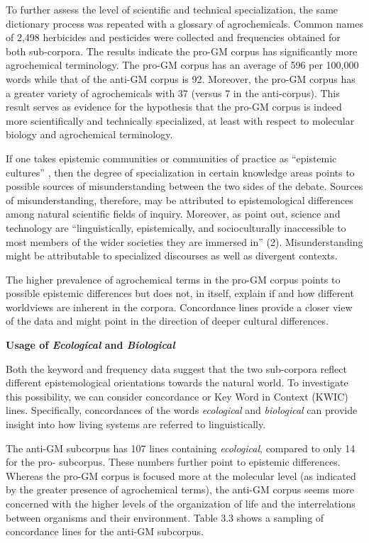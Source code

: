 To further assess the level of scientific and technical specialization, the same dictionary process was repeated with a glossary of agrochemicals. Common names of 2,498 herbicides \citep{UniversityofKentuckya} and pesticides \citep{Wood2018a} were collected and frequencies obtained for both sub-corpora. The results indicate the pro-GM corpus has significantly more agrochemical terminology. The pro-GM corpus has an average of 596 per 100,000 words while that of the anti-GM corpus is 92. Moreover, the pro-GM corpus has a greater variety of agrochemicals with 37 (versus 7 in the anti-corpus). This result serves as evidence for the hypothesis that the pro-GM corpus is indeed more scientifically and technically specialized, at least with respect to molecular biology and agrochemical terminology.

If one takes epistemic communities or communities of practice as ``epistemic cultures'' \citep{Knorr-Cetina1999}, then the degree of specialization in certain knowledge areas points to possible sources of misunderstanding between the two sides of the debate. Sources of misunderstanding, therefore, may be attributed to epistemological differences among natural scientific fields of inquiry. Moreover, as \cite*{Reyes-Galindo2017a} point out, science and technology are ``linguistically, epistemically, and socioculturally inaccessible to most members of the wider societies they are immersed in'' (2). Misunderstanding might be attributable to specialized discourses as well as divergent contexts. 

The higher prevalence of agrochemical terms in the pro-GM corpus points to possible epistemic differences but does not, in itself, explain if and how different worldviews are inherent in the corpora. Concordance lines provide a closer view of the data and might point in the direction of deeper cultural differences.

\textbf{Usage of \textit{Ecological} and \textit{Biological}}

Both the keyword and frequency data suggest that the two sub-corpora reflect different epistemological orientations towards the natural world. To investigate this possibility, we can consider concordance or Key Word in Context (KWIC) lines. Specifically, concordances of the words \textit{ecological} and \textit{biological} can provide insight into how living systems are referred to linguistically. 

The anti-GM subcorpus has 107 lines containing \textit{ecological}, compared to only 14 for the pro- subcorpus. These numbers further point to epistemic differences. Whereas the pro-GM corpus is focused more at the molecular level (as indicated by the greater presence of agrochemical terms), the anti-GM corpus seems more concerned with the higher levels of the organization of life and the interrelations between organisms and their environment. Table 3.3 shows a sampling of concordance lines for the anti-GM subcorpus. 


